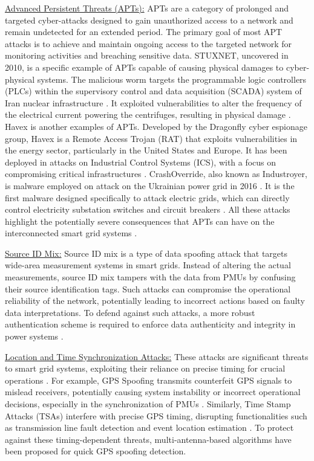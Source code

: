 \documentclass[10pt, journal]{IEEEtran}
\begin{document}
\underline{Advanced Persistent Threats (APTs):} APTs are a category of prolonged and targeted cyber-attacks designed to gain unauthorized access to a network and remain undetected for an extended period. The primary goal of most APT attacks is to achieve and maintain ongoing access to the targeted network for monitoring activities and breaching sensitive data. STUXNET, uncovered in 2010, is a specific example of APTs capable of causing physical damages to cyber-physical systems. The malicious worm targets the programmable logic controllers (PLCs) within the supervisory control and data acquisition (SCADA) system of Iran nuclear infrastructure \cite{shakarian2011stuxnet}. It exploited vulnerabilities to alter the frequency of the electrical current powering the centrifuges, resulting in physical damage \cite{farwell2011stuxnet}. Havex is another examples of APTs. Developed by the Dragonfly cyber espionage group, Havex is a Remote Access Trojan (RAT) that exploits vulnerabilities in the energy sector, particularly in the United States and Europe. It has been deployed in attacks on Industrial Control Systems (ICS), with a focus on compromising critical infrastructures \cite{hentunen2014havex, response2014dragonfly, wangen2015role}. CrashOverride, also known as Industroyer, is malware employed on attack on the Ukrainian power grid in 2016 \cite{lee2017crashoverride,slowik2019crashoverride}. It is the first malware designed specifically to attack electric grids, which can directly control electricity substation switches and circuit breakers \cite{bindra2017securing}. All these attacks highlight the potentially severe consequences that APTs can have on the interconnected smart grid systems \cite{zetter2015countdown,chen2010stuxnet,falliere2011w32}.
			
\underline{Source ID Mix:} Source ID mix is a type of data spoofing attack that targets wide-area measurement systems in smart grids. Instead of altering the actual measurements, source ID mix tampers with the data from PMUs by confusing their source identification tags. Such attacks can compromise the operational reliability of the network, potentially leading to incorrect actions based on faulty data interpretations. To defend against such attacks, a more robust authentication scheme is required to enforce data authenticity and integrity in power systems \cite{cui2019spatio, liu2020model}. 

\underline{Location and Time Synchronization Attacks:} These attacks are significant threats to smart grid systems, exploiting their reliance on precise timing for crucial operations \cite{fan2017synchrophasor, zhang2013time}. For example, GPS Spoofing transmits counterfeit GPS signals to mislead receivers, potentially causing system instability or incorrect operational decisions, especially in the synchronization of PMUs \cite{jafarnia2012gps}. Similarly, Time Stamp Attacks (TSAs) interfere with precise GPS timing, disrupting functionalities such as transmission line fault detection and event location estimation \cite{gong2012gps}. To protect against these timing-dependent threats, multi-antenna-based algorithms have been proposed for quick GPS spoofing detection.
   
\end{document}
